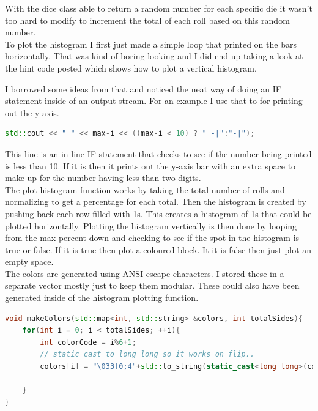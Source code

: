 \documentclass[a4paper,12pt]{article}
\begin{document}
With the dice class able to return a random number for each specific die it wasn't too hard to modify to increment the total of each roll based on this random number.\\

To plot the histogram I first just made a simple loop that printed on the bars horizontally.  That was kind of boring looking and I did end up taking a look at the hint code posted which shows how to plot a vertical histogram.

I borrowed some ideas from that and noticed the neat way of doing an IF statement inside of an output stream.  For an example I use that to for printing out the y-axis.\\

  \begin{lstlisting}[language=cpp,caption={Inline IF statements}]
	    std::cout << " " << max-i << ((max-i < 10) ? " -|":"-|");
  \end{lstlisting}
  
This line is an in-line IF statement that checks to see if the number being printed is less than 10.  If it is then it prints out the y-axis bar with an extra space to make up for  the number having less than two digits. \\

The plot histogram function works by taking the total number of rolls and normalizing to get a percentage for each total.  Then the histogram is created by pushing back each row filled with 1s. This creates a histogram of 1s that could be plotted horizontally.  Plotting the histogram vertically is then done by looping from the max percent down and checking to see if the spot in the histogram is true or false.  If it is true then plot a coloured block.  It it is false then just plot an empty space. \\

The colors are generated using ANSI escape characters.  I stored these in a separate vector mostly just to keep them modular. These could also have been generated inside of the histogram plotting function. \\

  \begin{lstlisting}[language=cpp,caption={Generating color ansi excape strings}]
void makeColors(std::map<int, std::string> &colors, int totalSides){
    for(int i = 0; i < totalSides; ++i){
        int colorCode = i%6+1;
        // static cast to long long so it works on flip.. 
        colors[i] = "\033[0;4"+std::to_string(static_cast<long long>(colorCode))+"m";

    }
}

  \end{lstlisting}
  
\end{document}
